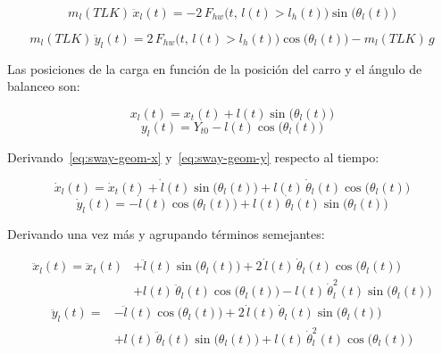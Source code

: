 \documentclass[12pt, a4paper]{article}
\begin{document}
\begin{equation}
    \label{eq:sway-x}
    m_l(TLK)\,\ddot{x}_l(t) = -2\,F_{hw}\!\bigl(t,\,l(t)>l_h(t)\bigr)\sin\!\bigl(\theta_l(t)\bigr)
\end{equation}

\begin{equation}
    \label{eq:sway-y}
    m_l(TLK)\,\ddot{y}_l(t) = 2\,F_{hw}\!\bigl(t,\,l(t)>l_h(t)\bigr)\cos\!\bigl(\theta_l(t)\bigr)
                               - m_l(TLK)\,g
\end{equation}

Las posiciones de la carga en función de la posición del carro y el ángulo de
balanceo son:

\begin{equation}
    \label{eq:sway-geom-x}
    x_l(t) = x_t(t) + l(t)\sin\!\bigl(\theta_l(t)\bigr)
\end{equation}
\begin{equation}
    \label{eq:sway-geom-y}
    y_l(t) = Y_{t0} - l(t)\cos\!\bigl(\theta_l(t)\bigr)
\end{equation}

Derivando~\eqref{eq:sway-geom-x} y~\eqref{eq:sway-geom-y} respecto al tiempo:

\begin{equation}
    \label{eq:sway-dxl}
    \dot{x}_l(t) = \dot{x}_t(t) + \dot{l}(t)\sin\!\bigl(\theta_l(t)\bigr)
                   + l(t)\,\dot{\theta}_l(t)\cos\!\bigl(\theta_l(t)\bigr)
\end{equation}
\begin{equation}
    \label{eq:sway-dyl}
    \dot{y}_l(t) = -\dot{l}(t)\cos\!\bigl(\theta_l(t)\bigr)
                   + l(t)\,\dot{\theta}_l(t)\sin\!\bigl(\theta_l(t)\bigr)
\end{equation}

Derivando una vez más y agrupando términos semejantes:

\begin{equation}
\label{eq:sway-ddxl}
\begin{split}
    \ddot{x}_l(t) = \ddot{x}_t(t)
    &+ \ddot{l}(t)\sin\!\bigl(\theta_l(t)\bigr)
     + 2\,\dot{l}(t)\,\dot{\theta}_l(t)\cos\!\bigl(\theta_l(t)\bigr) \\
    &+ l(t)\,\ddot{\theta}_l(t)\cos\!\bigl(\theta_l(t)\bigr)
     - l(t)\,\dot{\theta}_l^2(t)\sin\!\bigl(\theta_l(t)\bigr)
\end{split}
\end{equation}
\begin{equation}
\label{eq:sway-ddyl}
\begin{split}
    \ddot{y}_l(t) =
    &-\ddot{l}(t)\cos\!\bigl(\theta_l(t)\bigr)
     + 2\,\dot{l}(t)\,\dot{\theta}_l(t)\sin\!\bigl(\theta_l(t)\bigr) \\
    &+ l(t)\,\ddot{\theta}_l(t)\sin\!\bigl(\theta_l(t)\bigr)
     + l(t)\,\dot{\theta}_l^2(t)\cos\!\bigl(\theta_l(t)\bigr)
\end{split}
\end{equation}
\end{document}
